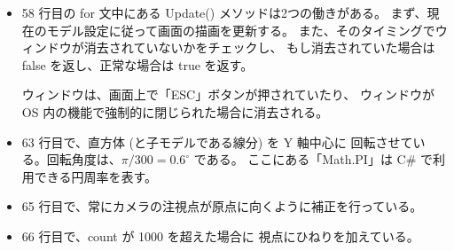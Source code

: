 \begin{itemize}
\item 58 行目の for 文中にある Update() メソッドは2つの働きがある。
	まず、現在のモデル設定に従って画面の描画を更新する。
	また、そのタイミングでウィンドウが消去されていないかをチェックし、
	もし消去されていた場合は false を返し、正常な場合は true を返す。

	ウィンドウは、画面上で「ESC」ボタンが押されていたり、
	ウィンドウが OS 内の機能で強制的に閉じられた場合に消去される。

 \item 63 行目で、直方体 (と子モデルである線分) を Y 軸中心に
	回転させている。回転角度は、\(\pi/300 = 0.6 ^{\circ}\) である。
	ここにある「Math.PI」は C\# で利用できる円周率を表す。

 \item 65 行目で、常にカメラの注視点が原点に向くように補正を行っている。

 \item 66 行目で、count が 1000 を超えた場合に
	視点にひねりを加えている。
\end{itemize} ~
